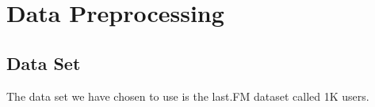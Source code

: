\section{Data Preprocessing}
\subsection{Data Set}
The data set we have chosen to use is the last.FM\cite{lastfm} dataset called 1K users\parencite{lastfmdataset}.